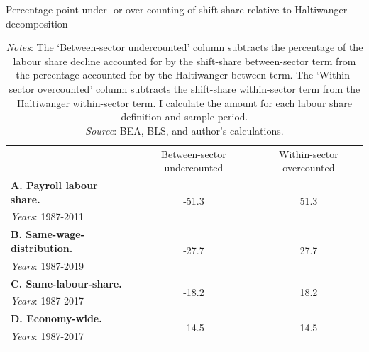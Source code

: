 \begin{table}[h]
    \centering
    \small
    \caption{\normalsize Percentage point under- or over-counting of shift-share relative to Haltiwanger decomposition}
    \begin{tabular}{lcc}
       \toprule[1.1pt]
        
        & Between-sector undercounted & Within-sector overcounted \\
        
        \cmidrule[0.8pt](lr{0.125em}){2-3}

       \textbf{A. Payroll labour share.} & \multirow{2}{*}{-51.3} & \multirow{2}{*}{51.3} \\
       \textit{Years}: 1987-2011 &  &  \\

       \textbf{B. Same-wage-distribution.} & \multirow{2}{*}{-27.7} & \multirow{2}{*}{27.7}\\
       \textit{Years}: 1987-2019 &  &  \\

       \textbf{C. Same-labour-share.} & \multirow{2}{*}{-18.2} & \multirow{2}{*}{18.2}\\
       \textit{Years}: 1987-2017 &  &  \\

       \textbf{D. Economy-wide.} & \multirow{2}{*}{-14.5} & \multirow{2}{*}{14.5}  \\
       \textit{Years}: 1987-2017 &  &  \\       
       \bottomrule[1.1pt]
    \end{tabular}
    
\begin{minipage}{\linewidth}
\captionsetup{justification=raggedright,singlelinecheck=false}
    \caption*{\textit{Notes}: The `Between-sector undercounted' column subtracts the percentage of the labour share decline accounted for by the shift-share between-sector term from the percentage accounted for by the Haltiwanger between term. The `Within-sector overcounted' column subtracts the shift-share within-sector term from the Haltiwanger within-sector term. I calculate the amount for each labour share definition and sample period. \\
    \textit{Source}: BEA, BLS, and author's calculations.}
\end{minipage}
    \label{tab:rr}
\end{table}



